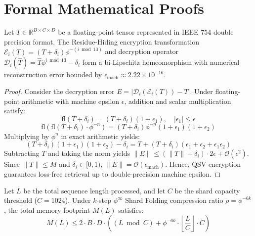 \section{Formal Mathematical Proofs}

\begin{theorem}
Let $T \in \mathbb{R}^{B \times C \times D}$ be a floating-point tensor represented in IEEE 754 double precision format. The Residue-Hiding encryption transformation $\mathcal{E}_i(T) = (T + \delta_i) \phi^{-(i \bmod 13)}$ and decryption operator $\mathcal{D}_i(\hat{T}) = \hat{T} \phi^{i \bmod 13} - \delta_i$ form a bi-Lipschitz homeomorphism with numerical reconstruction error bounded by $\epsilon_{\text{mach}} \approx 2.22 \times 10^{-16}$.
\end{theorem}

\begin{proof}
Consider the decryption error $E = |\mathcal{D}_i(\mathcal{E}_i(T)) - T|$.
Under floating-point arithmetic with machine epsilon $\epsilon$, addition and scalar multiplication satisfy:
\begin{equation}
    \text{fl}(T + \delta_i) = (T + \delta_i)(1 + \epsilon_1), \quad |\epsilon_1| \le \epsilon
\end{equation}
\begin{equation}
    \text{fl}\left(\text{fl}(T + \delta_i) \cdot \phi^{-n}\right) = (T + \delta_i)\phi^{-n}(1 + \epsilon_1)(1 + \epsilon_2)
\end{equation}
Multiplying by $\phi^n$ in exact arithmetic yields:
\begin{equation}
    (T + \delta_i)(1 + \epsilon_1)(1 + \epsilon_2) - \delta_i = T + (T + \delta_i)(\epsilon_1 + \epsilon_2 + \epsilon_1\epsilon_2)
\end{equation}
Subtracting $T$ and taking the norm yields $\|E\| \le (\|T\| + \delta_i) \cdot 2\epsilon + \mathcal{O}(\epsilon^2)$. Since $\|T\| \le M$ and $\delta_i \in [0, 1)$, $\|E\| = \mathcal{O}(\epsilon_{\text{mach}})$. Hence, QSV encryption guarantees loss-free retrieval up to double-precision machine epsilon.
\end{proof}

\begin{theorem}
Let $L$ be the total sequence length processed, and let $C$ be the shard capacity threshold ($C = 1024$). Under $k$-step $\phi^\infty$ Shard Folding compression ratio $\rho = \phi^{-6k}$, the total memory footprint $M(L)$ satisfies:
\begin{equation}
    M(L) \le 2 \cdot B \cdot D \cdot \left((L \bmod C) + \phi^{-6k} \cdot \left\lfloor \frac{L}{C} \right\rfloor \cdot C\right)
\end{equation}
\end{theorem}

